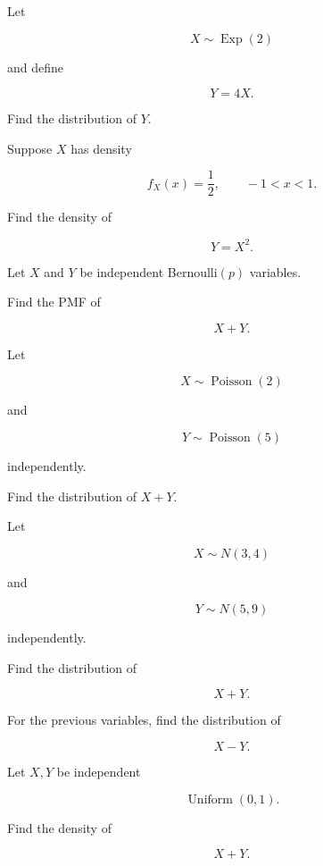 \begin{exercise}[2]
Let

\[
X\sim\operatorname{Exp}(2)
\]

and define

\[
Y=4X.
\]

Find the distribution of \(Y\).
\end{exercise}

\begin{exercise}[2]
Suppose \(X\) has density

\[
f_X(x)
=
\frac12,
\qquad
-1<x<1.
\]

Find the density of

\[
Y=X^2.
\]
\end{exercise}

\begin{exercise}[2]
Let \(X\) and \(Y\) be independent Bernoulli\((p)\) variables.

Find the PMF of

\[
X+Y.
\]
\end{exercise}

\begin{exercise}[2]
Let

\[
X\sim\operatorname{Poisson}(2)
\]

and

\[
Y\sim\operatorname{Poisson}(5)
\]

independently.

Find the distribution of \(X+Y\).
\end{exercise}

\begin{exercise}[2]
Let

\[
X\sim N(3,4)
\]

and

\[
Y\sim N(5,9)
\]

independently.

Find the distribution of

\[
X+Y.
\]
\end{exercise}

\begin{exercise}[2]
For the previous variables, find the distribution of

\[
X-Y.
\]
\end{exercise}

\begin{exercise}[2]
Let \(X,Y\) be independent

\[
\operatorname{Uniform}(0,1).
\]

Find the density of

\[
X+Y.
\]
\end{exercise}

